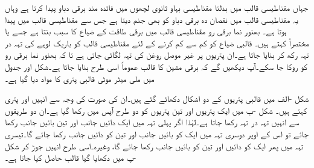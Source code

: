 جہاں مقناطیسی قالب میں بدلتا مقناطیسی بہاو ثانوی لچھوں میں فائدہ مند برقی دباو پیدا کرتا ہے وہاں یہ مقناطیسی قالب میں نقصان دہ برقی دباو کو بھی جنم دیتا ہے جس سے مقناطیسی قالب میں  پیدا ہوتا ہے۔ بھنور نما برقی رو مقناطیسی قالب میں برقی طاقت کے ضیاع کا سبب بنتا ہے جسے   یا  مختصراً  کہتے ہیں۔ قالبی ضیاع کو کم سے کم کرنے کے لئے مقناطیسی قالب کو  باریک لوہے کی  تہہ در تہہ رکھ کر بنایا جاتا ہے۔ان پتریوں پر غیر موصل روغن کی تہہ لگائی جاتی ہے تا کہ بھنور نما برقی رو کو روکا جا سکے۔آپ دیکھیں گے کہ برقی مشین کا قالب عموماً اسی طرح بنایا جاتا ہے۔شکل  اور جدول   میں  ملی میٹر موٹی  قالبی پتری کا  مواد دیا گیا ہے۔

شکل -الف میں قالبی پتریوں کے دو اشکال دکھائے گئے ہیں۔ان کی صورت کی وجہ سے انہیں  اور   پتری کہتے ہیں۔ شکل -ب میں ایک پتریوں اور تین پتریوں   کو دو طرح آپس میں رکھا گیا ہے۔ان دو طریقوں سے انہیں تہہ در تہہ رکھا جاتا ہے۔لہٰذا اگر پہلی تہہ میں ایک دائیں جانب اور تین بائیں جانب رکھا جائے تو اس کے اوپر دوسری تہہ میں ایک کو بائیں جانب اور تین کو دائیں جانب رکھا جائے گا۔تیسری تہہ میں پھر ایک کو دائیں اور تین کو بائیں جانب رکھا جائے گا، وغیرہ۔اسی طرح انہیں جوڑ کر شکل -پ میں دکھایا گیا قالب حاصل کیا جاتا ہے۔

